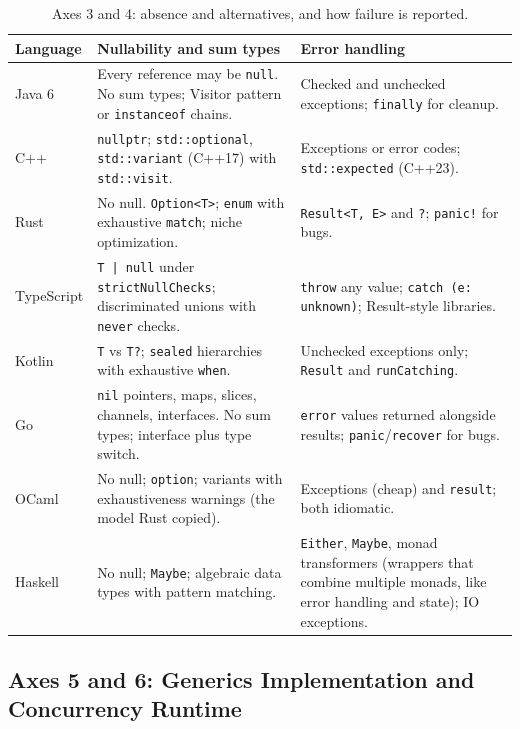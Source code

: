 \begin{table}[H]
\centering
\small
\begin{tabular}{@{}p{1.9cm}p{6.1cm}p{6.3cm}@{}}
\toprule
\textbf{Language} & \textbf{Nullability and sum types} & \textbf{Error handling} \\
\midrule
Java 6 & Every reference may be \texttt{null}. No sum types; Visitor pattern or \texttt{instanceof} chains. & Checked and unchecked exceptions; \texttt{finally} for cleanup. \\
C++ & \texttt{nullptr}; \texttt{std::optional}, \texttt{std::variant} (C++17) with \texttt{std::visit}. & Exceptions or error codes; \texttt{std::expected} (C++23). \\
Rust & No null. \texttt{Option<T>}; \texttt{enum} with exhaustive \texttt{match}; niche optimization. & \texttt{Result<T, E>} and \texttt{?}; \texttt{panic!} for bugs. \\
TypeScript & \texttt{T | null} under \texttt{strictNullChecks}; discriminated unions with \texttt{never} checks. & \texttt{throw} any value; \texttt{catch (e: unknown)}; Result-style libraries. \\
Kotlin & \texttt{T} vs \texttt{T?}; \texttt{sealed} hierarchies with exhaustive \texttt{when}. & Unchecked exceptions only; \texttt{Result} and \texttt{runCatching}. \\
Go & \texttt{nil} pointers, maps, slices, channels, interfaces. No sum types; interface plus type switch. & \texttt{error} values returned alongside results; \texttt{panic}/\texttt{recover} for bugs. \\
OCaml & No null; \texttt{option}; variants with exhaustiveness warnings (the model Rust copied). & Exceptions (cheap) and \texttt{result}; both idiomatic. \\
Haskell & No null; \texttt{Maybe}; algebraic data types with pattern matching. & \texttt{Either}, \texttt{Maybe}, monad transformers (wrappers that combine multiple monads, like error handling and state); IO exceptions. \\
\bottomrule
\end{tabular}
\caption{Axes 3 and 4: absence and alternatives, and how failure is reported.}
\label{ch11:tab-null-errors}
\end{table}

\subsection{Axes 5 and 6: Generics Implementation and Concurrency Runtime}

